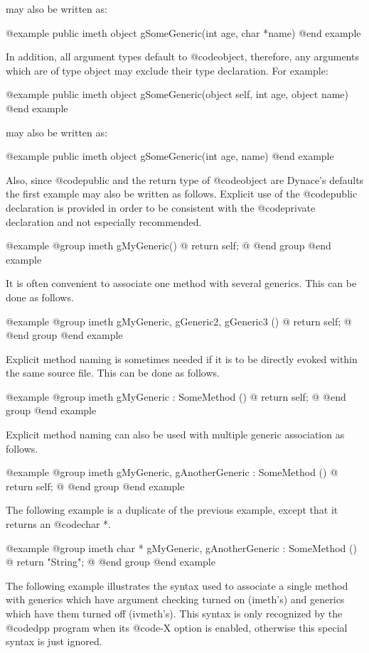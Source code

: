 may also be written as:

@example
public  imeth   object  gSomeGeneric(int age, char *name)
@end example


In addition, all argument types default to @code{object}, therefore,
any arguments which are of type object may exclude their type
declaration.  For example:

@example
public  imeth   object  gSomeGeneric(object self, int age, object name)
@end example

may also be written as:

@example
public  imeth   object  gSomeGeneric(int age, name)
@end example


Also, since @code{public} and the return type of @code{object} are
Dynace's defaults the first example may also be written as follows.
Explicit use of the @code{public} declaration is provided in order to
be consistent with the @code{private} declaration and not especially
recommended.

@example
@group
imeth   gMyGeneric()
@{
        return self;
@}
@end group
@end example




It is often convenient to associate one method with several generics.
This can be done as follows.

@example
@group
imeth   gMyGeneric, gGeneric2, gGeneric3 ()
@{
        return self;
@}
@end group
@end example


Explicit method naming is sometimes needed if it is to be directly
evoked within the same source file.  This can be done as follows.


@example
@group
imeth   gMyGeneric : SomeMethod ()
@{
        return self;
@}
@end group
@end example



Explicit method naming can also be used with multiple generic
association as follows.

@example
@group
imeth   gMyGeneric, gAnotherGeneric : SomeMethod ()
@{
        return self;
@}
@end group
@end example





The following example is a duplicate of the previous example, except
that it returns an @code{char *}.

@example
@group
imeth   char * gMyGeneric, gAnotherGeneric : SomeMethod ()
@{
        return "String";
@}
@end group
@end example


The following example illustrates the syntax used to associate a single
method with generics which have argument checking turned on (imeth's)
and generics which have them turned off (ivmeth's).  This syntax is
only recognized by the @code{dpp} program when its @code{-X} option is enabled,
otherwise this special syntax is just ignored.


